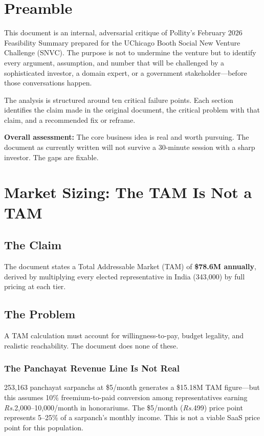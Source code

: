 \documentclass[12pt, a4paper]{article}
\newcommand{\rupee}{\textit{Rs.}}
\begin{document}
\section*{Preamble}

This document is an internal, adversarial critique of Pollity's February 2026 Feasibility Summary prepared for the UChicago Booth Social New Venture Challenge (SNVC). The purpose is not to undermine the venture but to identify every argument, assumption, and number that will be challenged by a sophisticated investor, a domain expert, or a government stakeholder---before those conversations happen.

The analysis is structured around ten critical failure points. Each section identifies the claim made in the original document, the critical problem with that claim, and a recommended fix or reframe.

\textbf{Overall assessment:} The core business idea is real and worth pursuing. The document as currently written will not survive a 30-minute session with a sharp investor. The gaps are fixable.

\newpage

\section{Market Sizing: The TAM Is Not a TAM}

\subsection{The Claim}
The document states a Total Addressable Market (TAM) of \textbf{\$78.6M annually}, derived by multiplying every elected representative in India (343,000) by full pricing at each tier.

\subsection{The Problem}

A TAM calculation must account for willingness-to-pay, budget legality, and realistic reachability. The document does none of these.

\subsubsection{The Panchayat Revenue Line Is Not Real}
253,163 panchayat sarpanchs at \$5/month generates a \$15.18M TAM figure---but this assumes 10\% freemium-to-paid conversion among representatives earning \rupee{}2,000--10,000/month in honorariums. The \$5/month (\rupee{}499) price point represents 5--25\% of a sarpanch's monthly income. This is not a viable SaaS price point for this population.
\end{document}
